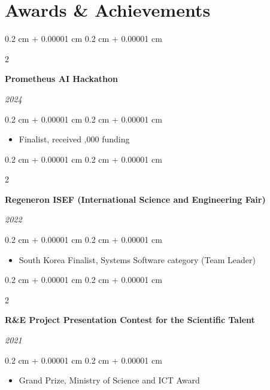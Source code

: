\documentclass[10pt, letterpaper]{article}
\newenvironment{highlights}{
    \begin{itemize}[
        topsep=0.10 cm,
        parsep=0.10 cm,
        partopsep=0pt,
        itemsep=0pt,
        leftmargin=0.4 cm + 10pt
    ]
}{
    \end{itemize}
} %
\newenvironment{onecolentry}{
    \begin{adjustwidth}{
        0.2 cm + 0.00001 cm
    }{
        0.2 cm + 0.00001 cm
    }
}{
    \end{adjustwidth}
} %
\newenvironment{twocolentry}[2][]{
    \onecolentry
    \def\secondColumn{#2}
    \setcolumnwidth{\fill, 4.5 cm}
    \begin{paracol}{2}
}{
    \switchcolumn \raggedleft \secondColumn
    \end{paracol}
    \endonecolentry
} %
\begin{document}
    \section{Awards \& Achievements}
        
        \begin{twocolentry}{
            
            
        \textit{2024}}
            \textbf{Prometheus AI Hackathon}
        \end{twocolentry}

        \vspace{0.10 cm}
        \begin{onecolentry}
            \begin{highlights}
                \item Finalist, received ,000 funding
            \end{highlights}
        \end{onecolentry}

        \vspace{0.2 cm}

        \begin{twocolentry}{
            
            
        \textit{2022}}
            \textbf{Regeneron ISEF (International Science and Engineering Fair)}
        \end{twocolentry}

        \vspace{0.10 cm}
        \begin{onecolentry}
            \begin{highlights}
                \item South Korea Finalist, Systems Software category (Team Leader)
            \end{highlights}
        \end{onecolentry}

        \vspace{0.2 cm}

        \begin{twocolentry}{
            
            
        \textit{2021}}
            \textbf{R\&E Project Presentation Contest for the Scientific Talent}
        \end{twocolentry}

        \vspace{0.10 cm}
        \begin{onecolentry}
            \begin{highlights}
                \item Grand Prize, Ministry of Science and ICT Award
            \end{highlights}
        \end{onecolentry}
\end{document}
